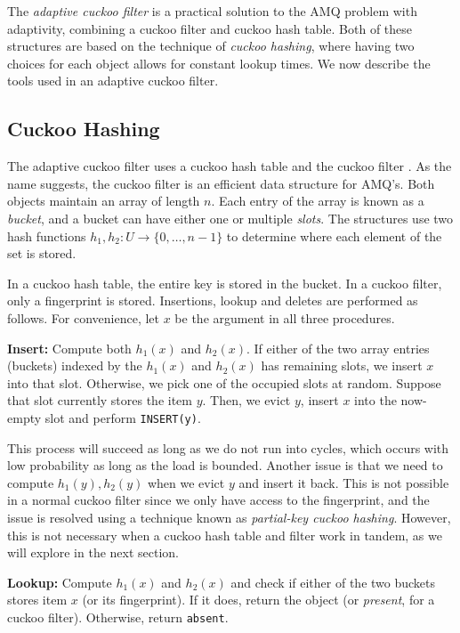 \documentclass[../paper.tex]{subfiles}
\begin{document}
\newcommand{\on}{\operatorname}
The \emph{adaptive cuckoo filter} \cite{adaptive-cuckoo} is a practical solution to the AMQ problem with adaptivity, combining a cuckoo filter and cuckoo hash table. Both of these structures are based on the
technique of \emph{cuckoo hashing}, where having two choices for each object allows for constant lookup times. We now describe the tools used in an adaptive cuckoo filter.

\subsection{Cuckoo Hashing}
The adaptive cuckoo filter uses a cuckoo hash table \cite{cuckoo-hash} and the cuckoo filter \cite{cuckoo-filter}. As the name suggests, the cuckoo filter is an
efficient data structure for AMQ's. Both objects maintain an array of length $n$. Each entry of the array is known as a \emph{bucket}, and a bucket can have either one or multiple \emph{slots}.
The structures use two hash functions $h_1,h_2:U\to \{0,\ldots,n-1\}$ to determine where each element of the set is stored.

In a cuckoo hash table, the entire key is stored in the bucket. In a cuckoo filter, only a fingerprint is stored. Insertions, lookup and deletes are performed as follows. For convenience, let $x$ be the argument in all three procedures.

\textbf{Insert:} Compute both $h_1(x)$ and $h_2(x)$. If either of the two array entries (buckets) indexed by the $h_1(x)$ and $h_2(x)$ has remaining slots, we insert $x$ into that slot.
Otherwise, we pick one of the occupied slots at random. Suppose that slot currently stores the item $y$. Then, we evict $y$, insert $x$ into the now-empty slot and perform \texttt{INSERT(y)}.

This process will succeed as long as we do not run into cycles, which occurs with low probability as long as the load is bounded. Another issue is that we need to compute $h_1(y),h_2(y)$
when we evict $y$ and insert it back. This is not possible in a normal cuckoo filter since we only have access to the fingerprint, and the issue is resolved using a technique known as \emph{partial-key cuckoo hashing}.
However, this is not necessary when a cuckoo hash table and filter work in tandem, as we will explore in the next section.

\textbf{Lookup:} Compute $h_1(x)$ and $h_2(x)$ and check if either of the two buckets stores item $x$ (or its fingerprint). If it does, return the object (or \textit{present}, for a cuckoo filter). Otherwise, return \texttt{absent}.
\end{document}
